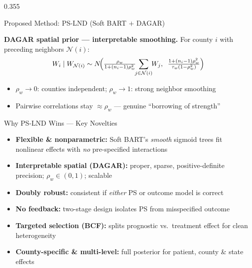 \documentclass[final]{beamer}
\begin{document}
\begin{frame}[fragile]
\begin{columns}[T]
\begin{column}{0.355\textwidth}
\begin{methodbox}{Proposed Method: PS-LND (Soft BART $+$ DAGAR)}
\vspace{3pt}
\begin{spatialbox}
{\color{FSUgarnet}\textbf{DAGAR spatial prior --- interpretable smoothing.}} For county $i$ with preceding neighbors $\mathcal{N}(i)$:
\vspace{-3pt}
$$W_i \mid W_{\mathcal{N}(i)} \sim N\!\Bigl(\tfrac{\rho_w}{1+(n_i-1)\rho_w^2}\!\!\sum_{j\in\mathcal{N}(i)}\!\! W_j,\;\; \tfrac{1+(n_i-1)\rho_w^2}{\tau_w(1-\rho_w^2)}\Bigr)$$
\vspace{-7pt}
\begin{itemize}
\item $\rho_w\!\to\!0$: counties independent;\; $\rho_w\!\to\!1$: strong neighbor smoothing
\item Pairwise correlations stay $\approx\rho_w$ --- genuine ``borrowing of strength''
\end{itemize}
\end{spatialbox}
\end{methodbox}

\vspace{4pt}

\begin{methodbox}{Why PS-LND Wins --- Key Novelties}
\begin{minipage}[t]{0.49\textwidth}
\begin{itemize}[itemsep=4pt]
\item[\color{accentgreen}\Large$\checkmark$] \textbf{Flexible \& nonparametric:} Soft BART's \emph{smooth} sigmoid trees fit nonlinear effects with \emph{no} pre-specified interactions
\item[\color{accentgreen}\Large$\checkmark$] \textbf{Interpretable spatial (DAGAR):} proper, sparse, positive-definite precision; $\rho_w\!\in\!(0,1)$; scalable
\item[\color{accentgreen}\Large$\checkmark$] \textbf{Doubly robust:} consistent if \emph{either} PS or outcome model is correct
\end{itemize}
\end{minipage}\hfill
\begin{minipage}[t]{0.49\textwidth}
\begin{itemize}[itemsep=4pt]
\item[\color{accentgreen}\Large$\checkmark$] \textbf{No feedback:} two-stage design isolates PS from misspecified outcome
\item[\color{accentgreen}\Large$\checkmark$] \textbf{Targeted selection (BCF):} splits prognostic vs.\ treatment effect for clean heterogeneity
\item[\color{accentgreen}\Large$\checkmark$] \textbf{County-specific \& multi-level:} full posterior for patient, county \& state effects
\end{itemize}
\end{minipage}
\end{methodbox}


\end{column}
\end{columns}
\end{frame}
\end{document}
